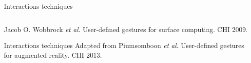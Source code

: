 \begin{frame}{Interactions techniques}
  \begin{columns}
    \begin{column}{0.22\textwidth}\end{column}
    \begin{column}{0.36\textwidth}\end{column}
    \begin{column}{0.42\textwidth}\end{column}
  \end{columns}
  Jacob O. Wobbrock \textit{et al.} User-defined gestures for surface computing. CHI 2009.
\end{frame}

\begin{frame}{Interactions techniques}
  Adapted from Piumsomboon \textit{et al.} User-defined gestures for augmented reality. CHI 2013.
\end{frame}